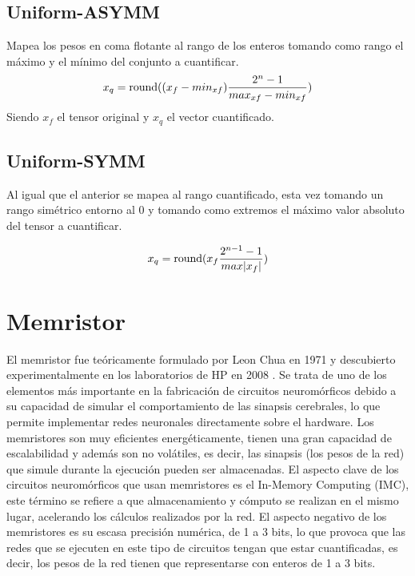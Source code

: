 \subsection{Uniform-ASYMM}
Mapea los pesos en coma flotante al rango de los enteros tomando como rango el máximo y el mínimo del conjunto a cuantificar. 
\begin{equation}
x_{q} = \operatorname{round}((x_f - min_{xf})\frac{2^n-1}{max_{xf}-min_{xf}})
\label{asymm}
\end{equation}
Siendo $x_f$ el tensor original y $x_q$ el vector cuantificado.

\subsection{Uniform-SYMM}
Al igual que el anterior se mapea al rango cuantificado, esta vez tomando un rango simétrico entorno al 0 y tomando como extremos el máximo valor absoluto del tensor a cuantificar.

\begin{equation}
    x_q = \operatorname{round}(x_f\frac{2^{n-1}-1}{max|x_f|})
    \label{symm}
\end{equation}

\section{Memristor}

El memristor fue teóricamente formulado por Leon Chua en 1971 \cite{1083337} y descubierto experimentalmente en los laboratorios de HP en 2008 \cite{RefWorks:RefID:24-strukov2008the}. Se trata de uno de los elementos más importante en la fabricación de circuitos neuromórficos debido a su capacidad de simular el comportamiento de las sinapsis cerebrales, lo que permite implementar redes neuronales directamente sobre el hardware. Los memristores son muy eficientes energéticamente, tienen una gran capacidad de escalabilidad y además son no volátiles, es decir, las sinapsis (los pesos de la red) que simule durante la ejecución pueden ser almacenadas. El aspecto clave de los circuitos neuromórficos que usan memristores es el In-Memory Computing (IMC), este término se refiere a que almacenamiento y cómputo se realizan en el mismo lugar, acelerando los cálculos realizados por la red. El aspecto negativo de los memristores es su escasa precisión numérica, de 1 a 3 bits, lo que provoca que las redes que se ejecuten en este tipo de circuitos tengan que estar cuantificadas, es decir, los pesos de la red tienen que representarse con enteros de 1 a 3 bits.


